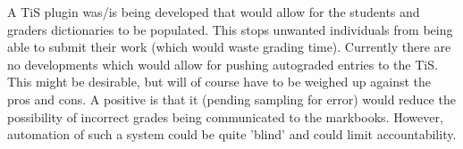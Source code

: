     A TiS plugin was/is being developed that would allow for the students and graders dictionaries to be populated. This stops unwanted individuals from being able to submit their work (which would waste grading time). Currently there are no developments which would allow for pushing autograded entries to the TiS. This might be desirable, but will of course have to be weighed up against the pros and cons. A positive is that it (pending sampling for error) would reduce the possibility of incorrect grades being communicated to the markbooks. However, automation of such a system could be quite 'blind' and could limit accountability.
    
    \clearpage
    
    
    
    